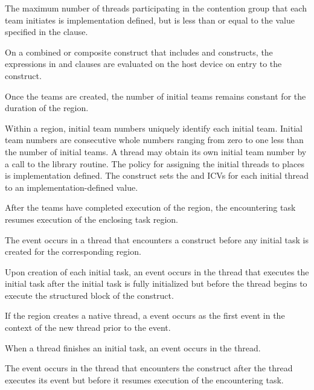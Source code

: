 The maximum number of threads participating in the contention group that 
each team initiates is implementation defined, but is less than or equal 
to the value specified in the  clause.

On a combined or composite construct that includes  and
 constructs, the expressions in  and
 clauses are evaluated on the host device on
entry to the  construct.

Once the teams are created, the number of initial teams remains constant 
for the duration of the  region.

Within a  region, initial team numbers uniquely identify each
initial team. Initial team numbers are consecutive whole numbers ranging 
from zero to one less than the number of initial teams. A thread may obtain 
its own initial team number by a call to the  library
routine. The policy for assigning the initial threads to places is 
implementation defined. The  construct sets the 
 and  ICVs for each initial 
thread to an implementation-defined value.

After the teams have completed execution of the  region, the 
encountering task resumes execution of the enclosing task region.

\events

The  event occurs in a thread that encounters a
 construct before any initial task is created for the
corresponding  region.

Upon creation of each initial task, an  event
occurs in the thread that executes the initial task after the initial
task is fully initialized but before the thread begins to execute the
structured block of the  construct.

If the  region creates a native thread, a 
event occurs as the first event in the context of the new thread prior to the 
 event.

When a thread finishes an initial task, an 
event occurs in the thread.

The  event occurs in the thread that encounters the
 construct after the thread executes its  
event but before it resumes execution of the encountering task.

